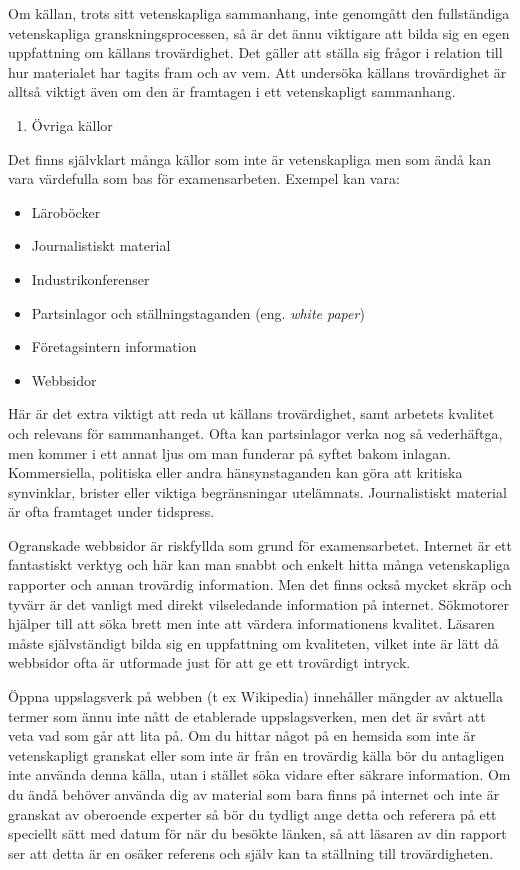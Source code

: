 Om källan, trots sitt vetenskapliga sammanhang, inte genomgått den
fullständiga vetenskapliga granskningsprocessen, så är det ännu
viktigare att bilda sig en egen uppfattning om källans trovärdighet. Det
gäller att ställa sig frågor i relation till hur materialet har tagits
fram och av vem. Att undersöka källans trovärdighet är alltså viktigt
även om den är framtagen i ett vetenskapligt sammanhang.

\begin{enumerate}
\def\labelenumi{\arabic{enumi}.}
\item
  Övriga källor
\end{enumerate}

Det finns självklart många källor som inte är vetenskapliga men som ändå
kan vara värdefulla som bas för examensarbeten. Exempel kan vara:

\begin{itemize}
\item
  Läroböcker
\item
  Journalistiskt material
\item
  Industrikonferenser
\item
  Partsinlagor och ställningstaganden (eng. \emph{white paper})
\item
  Företagsintern information
\item
  Webbsidor
\end{itemize}

Här är det extra viktigt att reda ut källans trovärdighet, samt arbetets
kvalitet och relevans för sammanhanget. Ofta kan partsinlagor verka nog
så vederhäftga, men kommer i ett annat ljus om man funderar på syftet
bakom inlagan. Kommersiella, politiska eller andra hänsynstaganden kan
göra att kritiska synvinklar, brister eller viktiga begränsningar
utelämnats. Journalistiskt material är ofta framtaget under tidspress.

Ogranskade webbsidor är riskfyllda som grund för examensarbetet.
Internet är ett fantastiskt verktyg och här kan man snabbt och enkelt
hitta många vetenskapliga rapporter och annan trovärdig information. Men
det finns också mycket skräp och tyvärr är det vanligt med direkt
vilseledande information på internet. Sökmotorer hjälper till att söka
brett men inte att värdera informationens kvalitet. Läsaren måste
självständigt bilda sig en uppfattning om kvaliteten, vilket inte är
lätt då webbsidor ofta är utformade just för att ge ett trovärdigt
intryck.

Öppna uppslagsverk på webben (t ex Wikipedia) innehåller mängder av
aktuella termer som ännu inte nått de etablerade uppslagsverken, men det
är svårt att veta vad som går att lita på. Om du hittar något på en
hemsida som inte är vetenskapligt granskat eller som inte är från en
trovärdig källa bör du antagligen inte använda denna källa, utan i
stället söka vidare efter säkrare information. Om du ändå behöver
använda dig av material som bara finns på internet och inte är granskat
av oberoende experter så bör du tydligt ange detta och referera på ett
speciellt sätt med datum för när du besökte länken, så att läsaren av
din rapport ser att detta är en osäker referens och själv kan ta
ställning till trovärdigheten.


